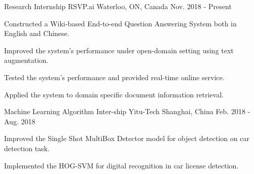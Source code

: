 

\begin{cventries}

  \cventry
    {Research Internship} %
    {RSVP.ai} %
    {Waterloo, ON, Canada} %
    {Nov. 2018 - Present} %
    {
      \begin{cvitems} %
        \item {Constructed a Wiki-based End-to-end Question Answering System both in English and Chinese.}
        \item {Improved the system's performance under open-domain setting using text augmentation.}
        \item {Tested the system's performance and provided real-time online service.}
        \item {Applied the system to domain specific document information retrieval.}
      \end{cvitems}
    }
     \cventry
    {Machine Learning Algorithm Inter-ship} %
    {Yitu-Tech} %
    {Shanghai, China} %
    {Feb. 2018 - Aug. 2018} %
    {
      \begin{cvitems} %
        \item {Improved the Single Shot MultiBox Detector model for object detection on car detection task.}
        \item {Implemented the HOG-SVM for digital recognition in car license detection.}
      \end{cvitems}
    }
    
\end{cventries}
